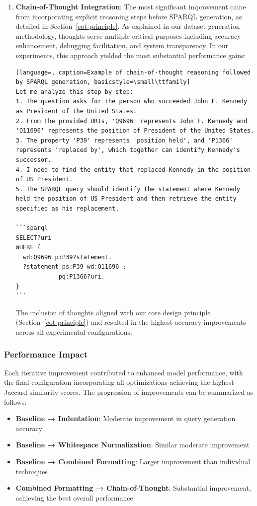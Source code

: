 \begin{enumerate}
    \item \textbf{Chain-of-Thought Integration}: The most significant improvement came from incorporating explicit reasoning steps before SPARQL generation, as detailed in Section~\ref{cot-principle}. As explained in our dataset generation methodology, thoughts serve multiple critical purposes including accuracy enhancement, debugging facilitation, and system transparency. In our experiments, this approach yielded the most substantial performance gains:
    \begin{lstlisting}[language=, caption=Example of chain-of-thought reasoning followed by SPARQL generation, basicstyle=\small\ttfamily]
Let me analyze this step by step:
1. The question asks for the person who succeeded John F. Kennedy as President of the United States.
2. From the provided URIs, 'Q9696' represents John F. Kennedy and 'Q11696' represents the position of President of the United States.
3. The property 'P39' represents 'position held', and 'P1366' represents 'replaced by', which together can identify Kennedy's successor.
4. I need to find the entity that replaced Kennedy in the position of US President.
5. The SPARQL query should identify the statement where Kennedy held the position of US President and then retrieve the entity specified as his replacement.

```sparql
SELECT?uri
WHERE {
  wd:Q9696 p:P39?statement.
  ?statement ps:P39 wd:Q11696 ;
            pq:P1366?uri.
}
```
    \end{lstlisting}
    
    The inclusion of thoughts aligned with our core design principle (Section~\ref{cot-principle}) and resulted in the highest accuracy improvements across all experimental configurations.
\end{enumerate}

\subsubsection{Performance Impact}

Each iterative improvement contributed to enhanced model performance, with the final configuration incorporating all optimizations achieving the highest Jaccard similarity scores. The progression of improvements can be summarized as follows:

\begin{itemize}
    \item \textbf{Baseline → Indentation}: Moderate improvement in query generation accuracy
    \item \textbf{Baseline → Whitespace Normalization}: Similar moderate improvement
    \item \textbf{Baseline → Combined Formatting}: Larger improvement than individual techniques
    \item \textbf{Combined Formatting → Chain-of-Thought}: Substantial improvement, achieving the best overall performance
\end{itemize}

